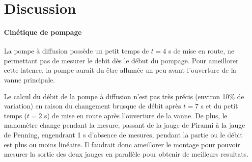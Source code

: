 \section{Discussion}

\paragraph{Cinétique de pompage}
La pompe à diffusion possède un petit temps de \(t = 4\) \si{\second} de mise en route, ne permettant pas de mesurer le debit dès le début du pompage. Pour ameillorer cette latence, la pompe aurait du être allumée un peu avant l'ouverture de la vanne principale.

Le calcul du débit de la pompe à diffusion n'est pas très précis (environ 10\% de variation) en raison du changement brusque de débit après \(t = 7\) \si{\second} et du petit temps (\(t = 2\) \si{\second}) de mise en route après l'ouverture de la vanne. De plus, le manomètre change pendant la mesure, passant de la jauge de Piranni à la jauge de Penning, engendrant 1 \si{\second} d'absence de mesures, pendant la partie ou le débit est plus ou moins linéaire. Il faudrait donc ameillorer le montage pour pouvoir mesurer la sortie des deux jauges en parallèle pour obtenir de meilleurs resultats.

